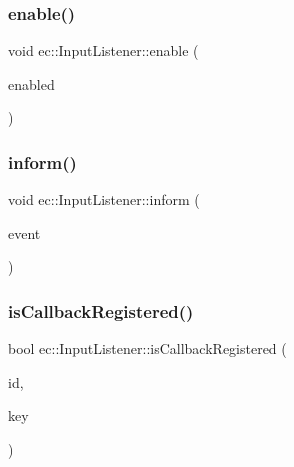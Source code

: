 \mbox{\label{classec_1_1_input_listener_a459a44443e7de70e854c2175b6c6914d}} 
\subsubsection{\texorpdfstring{enable()}{enable()}}
{\footnotesize\ttfamily void ec\+::\+Input\+Listener\+::enable (\begin{DoxyParamCaption}\item[{bool}]{enabled }\end{DoxyParamCaption})\hspace{0.3cm}{\ttfamily [virtual]}}

\mbox{\label{classec_1_1_input_listener_a39e0803651e945e177336df2cf84d61b}} 
\subsubsection{\texorpdfstring{inform()}{inform()}}
{\footnotesize\ttfamily void ec\+::\+Input\+Listener\+::inform (\begin{DoxyParamCaption}\item[{const \mbox{\hyperlink{structec_1_1_input_event}{Input\+Event}} \&}]{event }\end{DoxyParamCaption})}

\mbox{\label{classec_1_1_input_listener_a7904bb2c23ef7dc00e341b8b3c9d1afb}} 
\subsubsection{\texorpdfstring{is\+Callback\+Registered()}{isCallbackRegistered()}}
{\footnotesize\ttfamily bool ec\+::\+Input\+Listener\+::is\+Callback\+Registered (\begin{DoxyParamCaption}\item[{const std\+::string \&}]{id,  }\item[{\mbox{\hyperlink{classec_1_1_input_listener_af5dfb691564fa8e05fcf7f053e3c532b}{Event\+Key\+\_\+\+Type}}}]{key }\end{DoxyParamCaption})}


